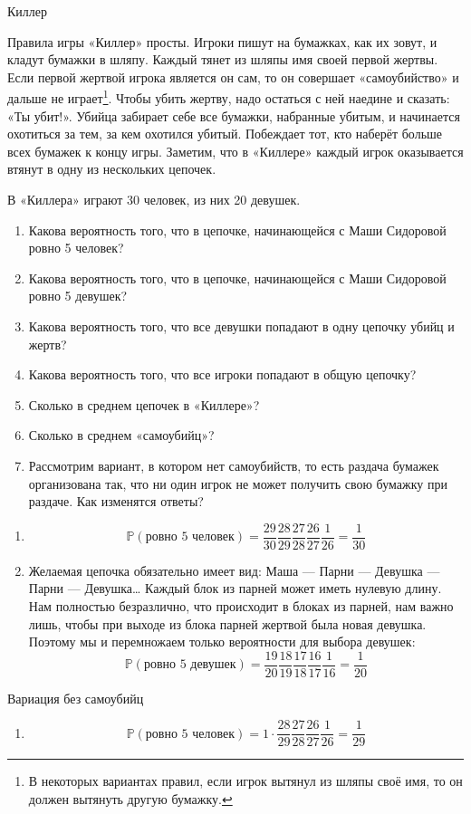 \documentclass[nobib]{tufte-handout}
\theoremstyle{definition}
\newcounter{problem}
\newenvironment{problem}%
{%
\refstepcounter{problem}%
     \hypertarget{problem:{\theproblem}}{}
     \Writetofile{solution_file}{\protect\hypertarget{soln:\theproblem}{}}
     \begin{myenum}[label=\bfseries\protect\hyperlink{soln:\theproblem}{\theproblem},ref=\theproblem]
     \item%
    }%
    {%
    \end{myenum}}
\renewcommand{\P}{\mathbb{P}}
\begin{document}
\begin{problem}
Киллер

Правила игры «Киллер» просты. Игроки пишут на бумажках, как их зовут,
и кладут бумажки в шляпу. Каждый тянет из шляпы имя своей первой жертвы.
Если первой жертвой игрока является он сам, то он совершает «самоубийство»
и дальше не играет\footnote{В некоторых вариантах правил,
если игрок вытянул из шляпы своё имя, то он должен вытянуть другую бумажку.}.
Чтобы убить жертву, надо остаться с ней наедине и сказать: «Ты убит!».
Убийца забирает себе все бумажки, набранные убитым, и начинается охотиться за тем,
за кем охотился убитый.  Побеждает тот, кто наберёт больше всех бумажек к концу игры.
Заметим, что в «Киллере» каждый игрок оказывается втянут в одну из нескольких цепочек.

В «Киллера» играют 30 человек, из них 20 девушек.

\begin{enumerate}
\item Какова вероятность того, что в цепочке,
начинающейся с Маши Сидоровой ровно 5 человек?
\item Какова вероятность того, что в цепочке,
начинающейся с Маши Сидоровой ровно 5 девушек?
\item Какова вероятность того, что все девушки попадают в одну цепочку убийц и жертв?
\item Какова вероятность того, что все игроки попадают в общую цепочку?
\item Сколько в среднем цепочек в «Киллере»?
\item Сколько в среднем «самоубийц»?
\item Рассмотрим вариант, в котором нет самоубийств,
то есть раздача бумажек организована так,
что ни один игрок не может получить свою бумажку при раздаче. Как изменятся ответы?
\end{enumerate}

\begin{sol}

\begin{enumerate}
\item
\[
\P(\text{ровно 5 человек}) =
\frac{29}{30} \frac{28}{29} \frac{27}{28} \frac{26}{27} \frac{1}{26} = \frac{1}{30}
\]
\item Желаемая цепочка обязательно имеет вид:
Маша — Парни — Девушка — Парни — Девушка\ldots
Каждый блок из парней может иметь нулевую длину.
Нам полностью безразлично, что происходит в блоках из парней, нам важно лишь,
чтобы при выходе из блока парней жертвой была новая девушка.
Поэтому мы и перемножаем только вероятности для выбора девушек:
\[
\P(\text{ровно 5 девушек}) =
\frac{19}{20} \frac{18}{19} \frac{17}{18} \frac{16}{17} \frac{1}{16} = \frac{1}{20}
\]
\end{enumerate}

Вариация без самоубийц
\begin{enumerate}
\item
\[
\P(\text{ровно 5 человек}) =
1 \cdot \frac{28}{29} \frac{27}{28} \frac{26}{27} \frac{1}{26} = \frac{1}{29}
\]
\end{enumerate}


\end{sol}

\end{problem}
\end{document}

